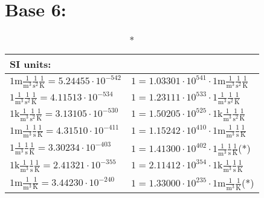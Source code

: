 
\chapter{Base 6:}
\begin{center}\begin{longtable}{l l}\caption*{SI units: }\\\hline{\color{gray}$1 \bm{\mathrm{ m}}\frac1{\operatorname{m}^3}\frac1{\operatorname{s}^2}{}\frac1{\operatorname{K}} = 5.24455\cdot10^{-542} $}   & {\color{gray}$ 1 = 1.03301\cdot10^{541} \cdot 1 \bm{\mathrm{ m}}\frac1{\operatorname{m}^3}\frac1{\operatorname{s}^2}{}\frac1{\operatorname{K}}$}  \\
{\color{black}$1 \bm{\mathrm{ }}\frac1{\operatorname{m}^3}\frac1{\operatorname{s}^2}{}\frac1{\operatorname{K}} = 4.11513\cdot10^{-534} $}   & {\color{black}$ 1 = 1.23111\cdot10^{533} \cdot 1 \bm{\mathrm{ }}\frac1{\operatorname{m}^3}\frac1{\operatorname{s}^2}{}\frac1{\operatorname{K}}$}  \\
{\color{gray}$1 \bm{\mathrm{ k}}\frac1{\operatorname{m}^3}\frac1{\operatorname{s}^2}{}\frac1{\operatorname{K}} = 3.13105\cdot10^{-530} $}   & {\color{gray}$ 1 = 1.50205\cdot10^{525} \cdot 1 \bm{\mathrm{ k}}\frac1{\operatorname{m}^3}\frac1{\operatorname{s}^2}{}\frac1{\operatorname{K}}$}  \\
{\color{gray}$1 \bm{\mathrm{ m}}\frac1{\operatorname{m}^3}\frac1{\operatorname{s}}{}\frac1{\operatorname{K}} = 4.31510\cdot10^{-411} $}   & {\color{gray}$ 1 = 1.15242\cdot10^{410} \cdot 1 \bm{\mathrm{ m}}\frac1{\operatorname{m}^3}\frac1{\operatorname{s}}{}\frac1{\operatorname{K}}$}  \\
{\color{black}$1 \bm{\mathrm{ }}\frac1{\operatorname{m}^3}\frac1{\operatorname{s}}{}\frac1{\operatorname{K}} = 3.30234\cdot10^{-403} $}   & {\color{black}$ 1 = 1.41300\cdot10^{402} \cdot 1 \bm{\mathrm{ }}\frac1{\operatorname{m}^3}\frac1{\operatorname{s}}{}\frac1{\operatorname{K}}$}\quad(*)\\
{\color{gray}$1 \bm{\mathrm{ k}}\frac1{\operatorname{m}^3}\frac1{\operatorname{s}}{}\frac1{\operatorname{K}} = 2.41321\cdot10^{-355} $}   & {\color{gray}$ 1 = 2.11412\cdot10^{354} \cdot 1 \bm{\mathrm{ k}}\frac1{\operatorname{m}^3}\frac1{\operatorname{s}}{}\frac1{\operatorname{K}}$}  \\
{\color{gray}$1 \bm{\mathrm{ m}}\frac1{\operatorname{m}^3}{}{}\frac1{\operatorname{K}} = 3.44230\cdot10^{-240} $}   & {\color{gray}$ 1 = 1.33000\cdot10^{235} \cdot 1 \bm{\mathrm{ m}}\frac1{\operatorname{m}^3}{}{}\frac1{\operatorname{K}}$}\quad(*)\\

\end{longtable}
\end{center}
